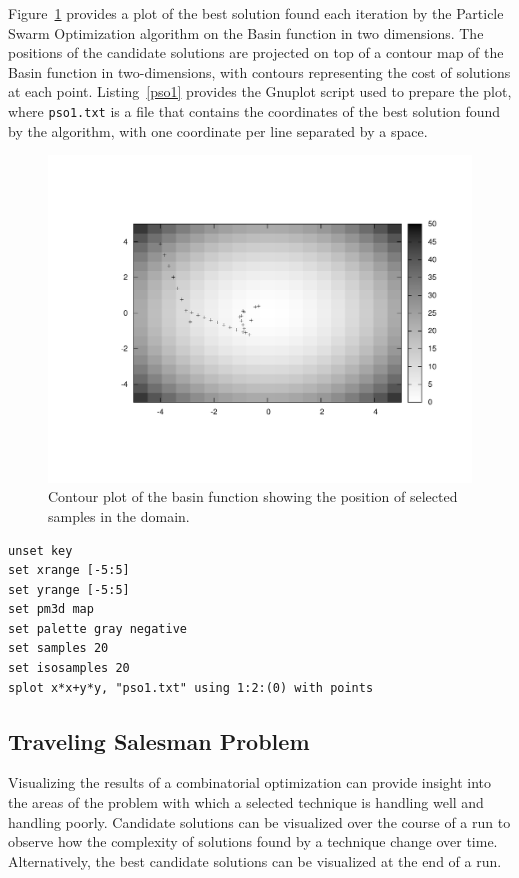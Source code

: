 \documentclass[a4paper, 11pt]{article}
\begin{document}
Figure~\ref{plot:pso1} provides a plot of the best solution found each iteration by the Particle Swarm Optimization algorithm on the Basin function in two dimensions. The positions of the candidate solutions are projected on top of a contour map of the Basin function in two-dimensions, with contours representing the cost of solutions at each point. Listing~\ref{pso1} provides the Gnuplot script used to prepare the plot, where \texttt{pso1.txt} is a file that contains the coordinates of the best solution found by the algorithm, with one coordinate per line separated by a space.

\begin{figure}[htp]
\centering
\includegraphics[scale=0.5]{pso1.pdf}
\caption{Contour plot of the basin function showing the position of selected samples in the domain.}
\label{plot:pso1}
\end{figure}

\begin{lstlisting}[caption=Gnuplot script use to create a contour plot and the position of selected samples from the domain., label=pso1]
unset key
set xrange [-5:5]
set yrange [-5:5]
set pm3d map
set palette gray negative
set samples 20
set isosamples 20
splot x*x+y*y, "pso1.txt" using 1:2:(0) with points
\end{lstlisting}

\subsection{Traveling Salesman Problem}
Visualizing the results of a combinatorial optimization can provide insight into the areas of the problem with which a selected technique is handling well and handling poorly.
Candidate solutions can be visualized over the course of a run to observe how the complexity of solutions found by a technique change over time. Alternatively, the best candidate solutions can be visualized at the end of a run. 
\end{document}
